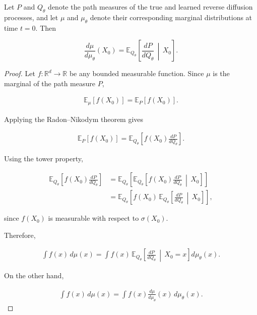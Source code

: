 \documentclass[10pt,a4paper]{amsart}
\begin{document}
\begin{lemma}
\label{lem:marginal-rn}
Let $P$ and $Q_\theta$ denote the path measures of the true and learned
reverse diffusion processes, and let $\mu$ and $\mu_\theta$ denote their
corresponding marginal distributions at time $t=0$. Then

\[
\boxed{
\frac{d\mu}{d\mu_\theta}(X_0)
=
\mathbb E_{Q_\theta}
\left[
\frac{dP}{dQ_\theta}
\,\middle|\,
X_0
\right].
}
\]

\end{lemma}

\begin{proof}

Let $f:\mathbb R^d\rightarrow\mathbb R$ be any bounded measurable function.
Since $\mu$ is the marginal of the path measure $P$,

\begin{align}
\mathbb E_\mu[f(X_0)]
=
\mathbb E_P[f(X_0)].
\end{align}

Applying the Radon--Nikodym theorem gives

\begin{align}
\mathbb E_P[f(X_0)]
=
\mathbb E_{Q_\theta}
\left[
f(X_0)
\frac{dP}{dQ_\theta}
\right].
\end{align}

Using the tower property,

\begin{align}
\mathbb E_{Q_\theta}
\left[
f(X_0)
\frac{dP}{dQ_\theta}
\right]
&=
\mathbb E_{Q_\theta}
\left[
\mathbb E_{Q_\theta}
\left[
f(X_0)
\frac{dP}{dQ_\theta}
\,\middle|\,
X_0
\right]
\right]
\nonumber \\ 
&=
\mathbb E_{Q_\theta}
\left[
f(X_0)
\,
\mathbb E_{Q_\theta}
\left[
\frac{dP}{dQ_\theta}
\,\middle|\,
X_0
\right]
\right],
\end{align}


since $f(X_0)$ is measurable with respect to $\sigma(X_0)$.

Therefore,

\begin{align}
\int
f(x)
\,d\mu(x)
=
\int
f(x)
\,
\mathbb E_{Q_\theta}
\left[
\frac{dP}{dQ_\theta}
\,\middle|\,
X_0=x
\right]
d\mu_\theta(x). \label{eq:test1}
\end{align}

On the other hand,

\begin{align}
\int
f(x)
\,d\mu(x)
=
\int
f(x)
\frac{d\mu}{d\mu_\theta}(x)
\,d\mu_\theta(x). \label{eq:test2}
\end{align}


\end{proof}
\end{document}
